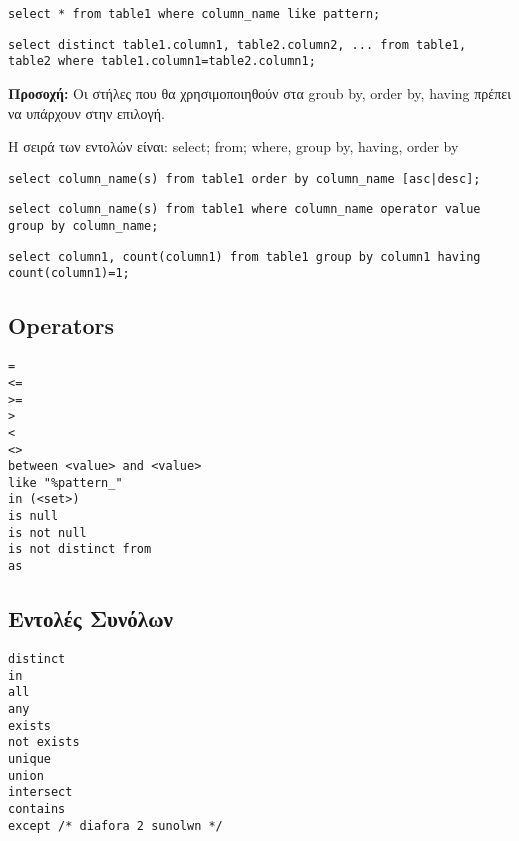 \begin{lstlisting}[caption=like example]
select * from table1 where column_name like pattern;
\end{lstlisting}

\begin{lstlisting}[caption=distinct example]
select distinct table1.column1, table2.column2, ... from table1, table2 where table1.column1=table2.column1;
\end{lstlisting}

\textbf{Προσοχή:} Oι στήλες που θα χρησιμοποιηθούν στα groub by, order by, having πρέπει να υπάρχουν στην επιλογή.

Η σειρά των εντολών είναι: select; from; where, group by, having, order by

\begin{lstlisting}[caption=order by example]
select column_name(s) from table1 order by column_name [asc|desc];
\end{lstlisting}

\begin{lstlisting}[caption=group by example]
select column_name(s) from table1 where column_name operator value group by column_name;
\end{lstlisting}

\begin{lstlisting}[caption=having example]
select column1, count(column1) from table1 group by column1 having count(column1)=1;
\end{lstlisting}

\subsection{Operators}

\begin{lstlisting}[caption=operators list]
=
<=
>=
>
<
<>
between <value> and <value>
like "%pattern_"
in (<set>)
is null
is not null
is not distinct from
as
\end{lstlisting}

\subsection{Εντολές Συνόλων}

\begin{lstlisting}[caption=set commands]
distinct
in
all
any
exists
not exists
unique
union
intersect
contains
except /* diafora 2 sunolwn */
\end{lstlisting}

